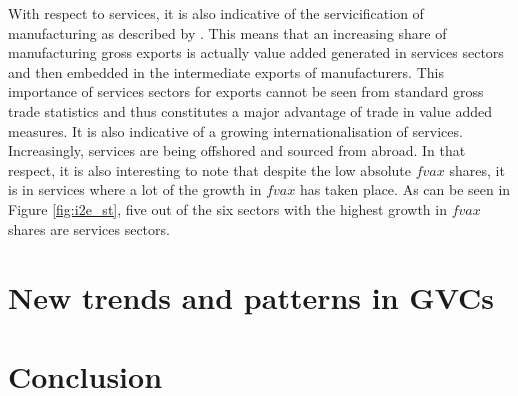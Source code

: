 \documentclass[11pt,a4paper]{article}
\begin{document}
With respect to services, it is also indicative of the servicification of manufacturing as described by \citet{ribaetal15}. This means that an increasing share of manufacturing gross exports is actually value added generated in services sectors and then embedded in the intermediate exports of manufacturers. This importance of services sectors for exports cannot be seen from standard gross trade statistics and thus constitutes a major advantage of trade in value added measures. It is also indicative of a growing internationalisation of services. Increasingly, services are being offshored and sourced from abroad. In that respect, it is also interesting to note that despite the low absolute $fvax$ shares, it is in services where a lot of the growth in $fvax$ has taken place. As can be seen in Figure \ref{fig:i2e_st}, five out of the six sectors with the highest growth in $fvax$ shares are services sectors.

\section{New trends and patterns in GVCs}\label{sec:news}



\section{Conclusion}\label{sec:conclusion}

\clearpage




\clearpage
\end{document}
